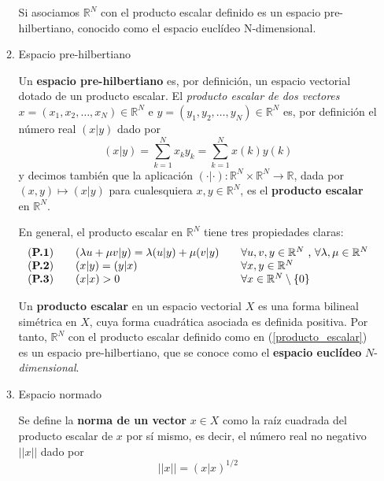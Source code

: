 \documentclass[a4paper, 12pt]{article}
\begin{document}
\begin{enumerate}[label=\textbf{\arabic*}.]
\begin{enumerate}[label=\textit{\alph*})]
Si asociamos \(\mathbb{R}^N\) con el producto escalar definido es un espacio pre-hilbertiano, conocido como el espacio euclídeo N-dimensional. \\
\medskip 

	\item Espacio pre-hilbertiano 
	
Un \textbf{espacio pre-hilbertiano} es, por definición, un espacio vectorial dotado de un producto escalar. El \textit{producto escalar de dos vectores} \(x = (x_1, x_2, \dotsc, x_N) \in \mathbb{R}^N\) e \(y = (y_1,y_2, \dotsc , y_N) \in \mathbb{R}^N\) es, por definición el número real \(\left( x | y \right)\) dado por
\begin{equation}\label{producto_escalar}
	\left( x | y \right) = \sum_{k=1}^{N} x_k y_k = \sum_{k=1}^{N} x(k) y(k)
\end{equation}
y decimos también que la aplicación \(\left( \cdot | \cdot \right) : \mathbb{R}^N \times \mathbb{R}^N \rightarrow \mathbb{R}\), dada por \((x,y) \mapsto (x|y)\) para cualesquiera \(x,y \in \mathbb{R}^N\), es el \textbf{producto escalar} en \(\mathbb{R}^N\). 

En general, el producto escalar en \(\mathbb{R}^N\) tiene tres propiedades claras:
\[
\begin{array}{lll}
\text{(\textbf{P.1})} \quad &(\lambda u + \mu v | y) = \lambda (u | y) +  \mu (v | y) \quad & \forall u,v,y \in \mathbb{R}^N \text{ , } \forall \lambda , \mu \in \mathbb{R}^N \\
\text{(\textbf{P.2})} \quad &(x|y) = (y|x) \quad &\forall x,y \in \mathbb{R}^N \\
\text{(\textbf{P.3})} \quad & (x|x) > 0 \quad & \forall x \in \mathbb{R}^N \setminus \{0 \}
\end{array}
\]

Un \textbf{producto escalar} en un espacio vectorial \(X\) es una forma bilineal simétrica en \(X\), cuya forma cuadrática asociada es definida positiva. Por tanto, \(\mathbb{R}^N\) con el producto escalar definido como en (\ref{producto_escalar}) es un espacio pre-hilbertiano, que se conoce como el \textbf{espacio euclídeo} \(N\)-\textit{dimensional}.

\medskip

	\item Espacio normado
	
Se define la \textbf{norma de un vector} \(x \in X\) como la raíz cuadrada del producto escalar de \(x\) por sí mismo, es decir, el número real no negativo \(||x||\) dado por
\begin{equation}\label{norma_escalar}
	||x|| = (x|x)^{1/2}
\end{equation}


\end{enumerate}
\end{enumerate}
\end{document}
